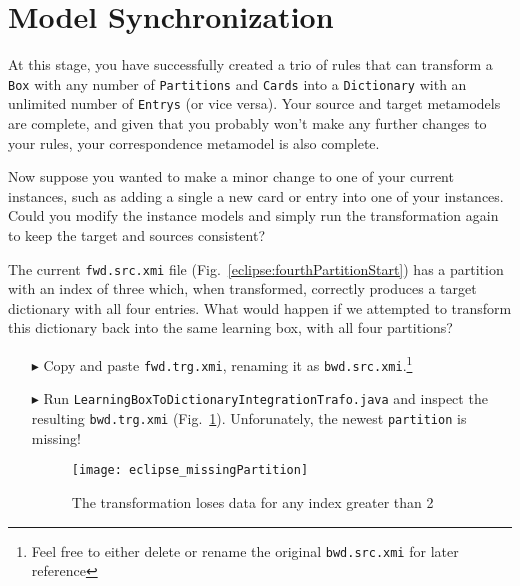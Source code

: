 \newpage
\section{Model Synchronization}
\genHeader

At this stage, you have successfully created a trio of rules that can transform a \texttt{Box} with any number of \texttt{Partitions} and
\texttt{Cards} into a \texttt{Dictionary} with an unlimited number of \texttt{Entrys} (or vice versa). Your source and target metamodels are complete, and given
that you probably won't make any further changes to your rules, your correspondence metamodel is also complete.

Now suppose you wanted to make a minor change to one of your current instances, such as adding a single a new card or entry into one of your instances. Could
you modify the instance models and simply run the transformation again to keep the target and sources consistent? 

The current \texttt{fwd.src.xmi} file (Fig.~\ref{eclipse:fourthPartitionStart}) has a partition with an index of three which, when transformed, correctly
produces a target dictionary with all four entries. What would happen if we attempted to transform this dictionary back into the same learning box, with all
four partitions?

\begin{itemize}

\item[$\blacktriangleright$] Copy and paste \texttt{fwd.trg.xmi}, renaming it as \texttt{bwd.src.xmi}.\footnote{Feel free to either delete or
rename the original \texttt{bwd.src.xmi} for later reference}

\item[$\blacktriangleright$] Run \texttt{LearningBoxToDictionaryIntegrationTrafo.java} and inspect the resulting \texttt{bwd.trg.xmi}
(Fig.~\ref{eclipse:missingP3}). Unforunately, the newest \texttt{part\-it\-ion} is missing!

\vspace{0.5cm}

\begin{figure}[htbp]
\begin{center}
  \texttt{[image: eclipse\_missingPartition]}
  \caption{The transformation loses data for any index greater than 2}
  \label{eclipse:missingP3}
\end{center}
\end{figure}
\end{itemize}

